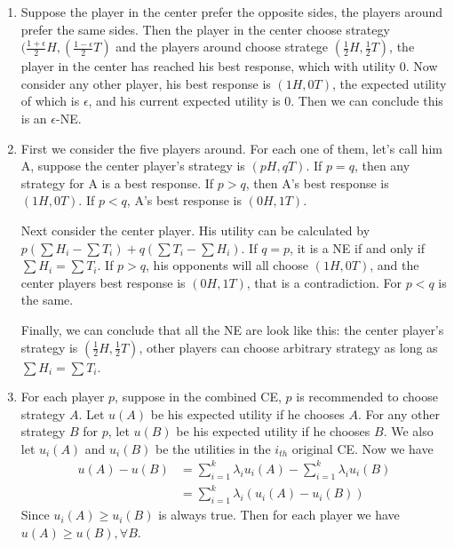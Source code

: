 \documentclass[12pt]{cgtmd}
\begin{document}

\begin{enumerate}
    \item Suppose the player in the center prefer the opposite sides, the players around prefer the same sides. Then the player in the center choose strategy $(\frac{1 + \epsilon}{2}H, (\frac{1 - \epsilon}{2}T)$ and the players around choose stratege $(\frac{1}{2}H, \frac{1}{2}T)$, the player in the center has reached his best response, which with utility $0$. Now consider any other player, his best response is $(1H, 0T)$, the expected utility of which is $\epsilon$, and his current expected utility is $0$. Then we can conclude this is an $\epsilon$-NE.
    \item First we consider the five players around. For each one of them, let's call him A, suppose the center player's strategy is $(pH, qT)$. If $p = q$, then any strategy for A is a best response. If $p > q$, then A's best response is $(1H, 0T)$. If $p < q$, A's best response is $(0H, 1T)$. 
        
        Next consider the center player. His utility can be calculated by $p(\sum H_i - \sum T_i) + q(\sum T_i - \sum H_i)$. If $q = p$, it is a NE if and only if $\sum H_i = \sum T_i$.  If $p > q$, his opponents will all choose $(1H, 0T)$, and the center players best response is $(0H, 1T)$, that is a contradiction. For $p < q$ is the same.

        Finally, we can conclude that all the NE are look like this: the center player's strategy is $(\frac{1}{2}H, \frac{1}{2}T)$, other players can choose arbitrary strategy as long as $\sum H_i = \sum T_i$.
    \item For each player $p$, suppose in the combined CE, $p$ is recommended to choose strategy $A$. Let $u(A)$ be his expected utility if he chooses $A$. For any other strategy $B$ for $p$, let $u(B)$ be his expected utility if he chooses $B$. We also let $u_i(A)$ and $u_i(B)$ be the utilities in the $i_{th}$ original CE. Now we have
        \begin{align*}
            u(A) - u(B) &= \sum_{i = 1}^k \lambda_iu_i(A) - \sum_{i = 1}^k \lambda_iu_i(B)\\
                        &= \sum_{i = 1}^k \lambda_i(u_i(A) - u_i(B))
        \end{align*}
        Since $u_i(A) \geq u_i(B)$ is always true. Then for each player we have $u(A) \geq u(B), \forall B$.

\end{enumerate}
\end{document}
